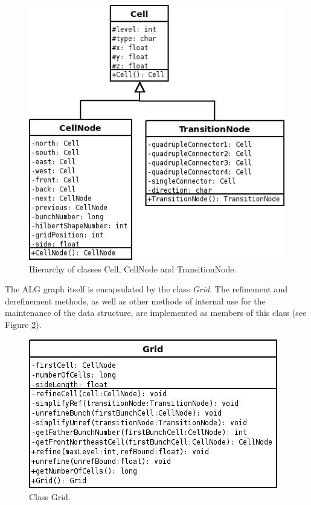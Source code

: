 \begin{figure}[H]
    \centering
    \includegraphics[scale=0.48,angle=0]{../img/cellDiagram.jpg}
    \caption{Hierarchy of classes Cell, CellNode and TransitionNode.}
    \label{FIG_CELL_DIAGRAM}
\end{figure}

The ALG graph itself is encapsulated by the class \textit{Grid}. The
refinement and derefinement methods, as well as other methods of
internal use for the maintenance of the data structure, are
implemented as members of this class (see Figure
\ref{FIG_GRID_DIAGRAM}).

\begin{figure}[!ht]
    \centering
    \includegraphics[scale=0.48,angle=0]{../img/gridDiagram.jpg}
    \caption{Class Grid.}
    \label{FIG_GRID_DIAGRAM}
\end{figure}


